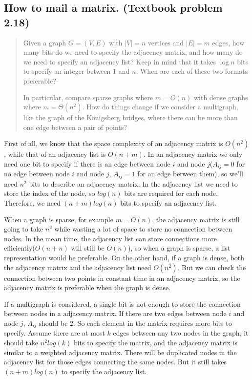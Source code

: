 
\subsection*{How to mail a matrix. (Textbook problem 2.18)}
    \begin{quote}
    Given a graph $G = (V, E)$ with $|V| = n$ vertices and $|E| = m$ edges, how many bits do we need to specify the adjacency matrix, and how many do we need to specify an adjacency list? 
Keep in mind that it takes $\log n$ bits to specify an integer between $1$ and $n$. When are each of these two formats preferable?

    In particular, compare sparse graphs where $m = O(n)$ with dense graphs where $m = \Theta(n^2)$. How do things change if we consider a multigraph, like the graph of the K\"{o}nigsberg bridges, where there can be more than one edge between a pair of points?
    \end{quote}

    \begin{solution}
        
        First of all, we know that the space complexity of an adjacency matrix is $O(n^2)$, while that of an adjacency list is $O(n+m)$. In an adjacency matrix we only need one bit to specify if there is an edge between node $i$ and node $j$($A_{ij} = 0$ for no edge between node $i$ and node $j$, $A_{ij} = 1$ for an edge between them), so we'll need $n^2$ bits to describe an adjacency matrix. In the adjacency list we need to store the index of the node, so $log(n)$ bits are required for each node. Therefore, we need $(n+m)log(n)$ bits to specify an adjacency list.
        
        When a graph is sparse, for example $m = O(n)$, the adjacency matrix is still going to take $n^2$ while wasting a lot of space to store no connection between nodes. In the mean time, the adjacency list can store connections more efficiently($O(n+n)$ will still be $O(n)$), so when a graph is sparse, a list representation would be preferable. On the other hand, if a graph is dense, both the adjacency matrix and the adjacency list need $O(n^2)$. But we can check the connection between two points in constant time in an adjacency matrix, so the adjacency matrix is preferable when the graph is dense.
        
        If a multigraph is considered, a single bit is not enough to store the connection between nodes in a adjacency matrix. If there are two edges between node $i$ and node $j$, $A_{ij}$ should be 2. So each element in the matrix requires more bits to specify. Assume there are at most $k$ edges between any two nodes in the graph, it should take $n^2log(k)$ bits to specify the matrix, and the adjacency matrix is similar to a weighted adjacency matrix. There will be duplicated nodes in the adjacency list for those edges connecting the same nodes. But it still takes $(n+m)log(n)$ to specify the adjacency list.
        
    \end{solution}
